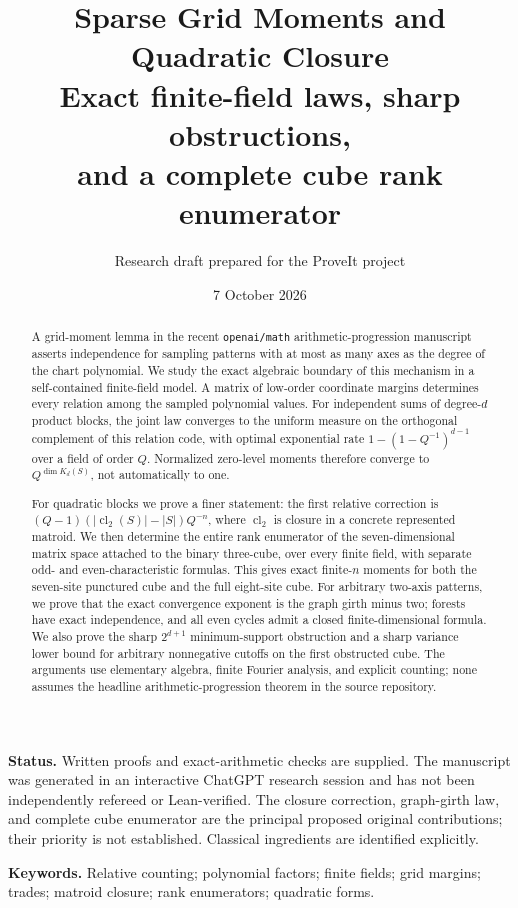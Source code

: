 \documentclass[11pt,a4paper]{article}
\title{\textbf{Sparse Grid Moments and Quadratic Closure}\\[5pt]
\large Exact finite-field laws, sharp obstructions,\\
and a complete cube rank enumerator}
\author{Research draft prepared for the ProveIt project}
\date{7 October 2026}
\numberwithin{equation}{section}
\theoremstyle{definition}
\theoremstyle{remark}
\newcommand{\1}{\mathbf 1}
\newcommand{\cl}{\operatorname{cl}}
\begin{document}
\maketitle
\thispagestyle{plain}
\begin{abstract}
A grid-moment lemma in the recent \texttt{openai/math} arithmetic-progression
manuscript asserts independence for sampling patterns with at most as many
axes as the degree of the chart polynomial. We study the exact algebraic
boundary of this mechanism in a self-contained finite-field model. A matrix
of low-order coordinate margins determines every relation among the sampled
polynomial values. For independent sums of degree-$d$ product blocks, the
joint law converges to the uniform measure on the orthogonal complement of
this relation code, with optimal exponential rate
$1-(1-Q^{-1})^{d-1}$ over a field of order $Q$. Normalized zero-level moments
therefore converge to $Q^{\dim K_d(S)}$, not automatically to one.

For quadratic blocks we prove a finer statement: the first relative
correction is $(Q-1)(|\cl_2(S)|-|S|)Q^{-n}$, where $\cl_2$ is closure in a
concrete represented matroid. We then determine the entire rank enumerator
of the seven-dimensional matrix space attached to the binary three-cube,
over every finite field, with separate odd- and even-characteristic
formulas. This gives exact finite-$n$ moments for both the seven-site
punctured cube and the full eight-site cube. For arbitrary two-axis
patterns, we prove that the exact convergence exponent is the graph girth
minus two; forests have exact independence, and all even cycles admit a
closed finite-dimensional formula. We also prove the sharp
$2^{d+1}$ minimum-support obstruction and a sharp variance lower bound for
arbitrary nonnegative cutoffs on the first obstructed cube. The arguments
use elementary algebra, finite Fourier analysis, and explicit counting;
none assumes the headline arithmetic-progression theorem in the source
repository.
\end{abstract}

\noindent\textbf{Status.} Written proofs and exact-arithmetic checks are supplied.
The manuscript was generated in an interactive ChatGPT research session and
has not been independently refereed or Lean-verified. The closure correction,
graph-girth law, and complete cube enumerator are the principal proposed original
contributions; their priority is not established. Classical ingredients are
identified explicitly.

\vspace{5pt}
\noindent\textbf{Keywords.} Relative counting; polynomial factors; finite fields;
grid margins; trades; matroid closure; rank enumerators; quadratic forms.
\end{document}
